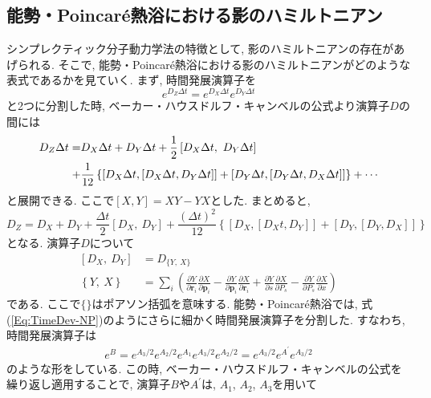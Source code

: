 \subsection{能勢・Poincar\'{e}熱浴における影のハミルトニアン}
シンプレクティック分子動力学法の特徴として, 影のハミルトニアンの存在があげられる.
そこで, 能勢・Poincar\'{e}熱浴における影のハミルトニアンがどのような表式であるかを見ていく. まず, 時間発展演算子を
\begin{equation}
  e^{D_{Z} \Delta t}
  =
  e^{D_{X} \Delta t}
  e^{D_{Y} \Delta t}
\end{equation}
と2つに分割した時, ベーカー・ハウスドルフ・キャンベルの公式より演算子$D$の間には
\begin{align}
  D_{Z} \Delta t
  =&
  D_{X} \Delta t + D_{Y} \Delta t
  +
  \frac{1}{2}
  \left[D_{X}\Delta t,~ D_{Y}\Delta t\right]
  \notag \\
  +&
  \frac{1}{12}
  \left\{
    \left[D_{X}\Delta t, \left[D_{X}\Delta t, D_{Y}\Delta t\right]  \right]
    +
    \left[D_{Y}\Delta t, \left[D_{Y}\Delta t, D_{X}\Delta t\right]\right]
  \right\}
  +\cdots
\end{align}
と展開できる. ここで$[X, Y]= XY- YX$とした. まとめると,
\begin{equation}
  D_{Z}
  =
  D_{X} + D_{Y}
  +
  \frac{\Delta t}{2}
  \left[D_{X},~ D_{Y}\right]
  +
  \frac{(\Delta t)^{2}}{12}
  \left\{
    \left[D_{X}, \left[D_{X}t, D_{Y}\right] \right]
    +
    \left[D_{Y}, \left[D_{Y}, D_{X}\right]\right]
  \right\}
\end{equation}
となる.
演算子$D$について
\begin{align}
  \left[D_{X},~ D_{Y}\right] &= D_{\{Y,~ X\}}
  \\
  \left\{Y,~ X\right\} &=
  \sum_{i}
  \left(
    \frac{\partial Y}{\partial \bm{r}_{i}}
    \frac{\partial X}{\partial \bm{p}_{i}}
    -
    \frac{\partial Y}{\partial \bm{p}_{i}}
    \frac{\partial X}{\partial \bm{r}_{i}}
    +
    \frac{\partial Y}{\partial s}
    \frac{\partial X}{\partial P_{s}}
    -
    \frac{\partial Y}{\partial P_{s}}
    \frac{\partial X}{\partial x}
  \right)
\end{align}
である. ここで$\{\}$はポアソン括弧を意味する.
能勢・Poincar\'{e}熱浴では, 式(\ref{Eq:TimeDev-NP})のようにさらに細かく時間発展演算子を分割した. 
すなわち, 時間発展演算子は
\begin{align}
  e^{B} = 
  e^{A_{3}/2} e^{A_{2}/2}
  e^{A_{1}}
  e^{A_{3}/2} e^{A_{2}/2}
  =
  e^{A_{3}/2} e^{A^{\prime}} e^{A_{3}/2}
\end{align}
のような形をしている. この時, ベーカー・ハウスドルフ・キャンベルの公式を繰り返し適用することで, 演算子$B$や$A^{\prime}$は, $A_1$, $A_2$, $A_{3}$を用いて
